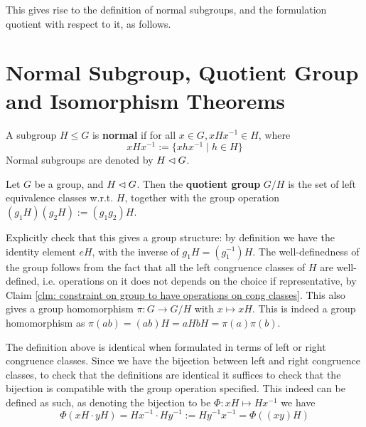\textstart
This gives rise to the definition of normal subgroups, and the formulation quotient with respect to it, as follows.

\section{Normal Subgroup, Quotient Group and Isomorphism Theorems}

\begin{definition}
    A subgroup $H \leq G$ is \textbf{normal} if for all $x \in G, xHx^{-1} \in H$, where
    \[
        xHx^{-1} := \{ xhx^{-1} \mid h \in H \}
    \]
    Normal subgroups are denoted by $H \lhd G$.
\end{definition}

\begin{definition}
    Let $G$ be a group, and $H \lhd G$. Then the \textbf{quotient group} $G/H$ is the set of left equivalence classes w.r.t. $H$, together with the group operation $(g_1 H)(g_2 H) := (g_1 g_2) H$.
\end{definition}

\begin{remark}\label{rmk: projection to quotient}
    Explicitly check that this gives a group structure: by definition we have the identity element $eH$, with the inverse of $g_1 H = (g_1^{-1})H$. The well-definedness of the group follows from the fact that all the left congruence classes of $H$ are well-defined, i.e. operations on it does not depends on the choice if representative, by Claim \ref{clm: constraint on group to have operations on cong classes}. This also gives a group homomorphism $\pi: G \to G/H$ with $x \mapsto xH$. This is indeed a group homomorphism as $\pi(ab) = (ab) H = aH bH = \pi(a) \pi(b)$. 
\end{remark}
    
\begin{remark}
    The definition above is identical when formulated in terms of left or right congruence classes. Since we have the bijection between left and right congruence classes, to check that the definitions are identical it suffices to check that the bijection is compatible with the group operation specified. This indeed can be defined as such, as denoting the bijection to be $\Phi: xH \mapsto Hx^{-1}$ we have
    \[
        \Phi(xH \cdot yH) = Hx^{-1} \cdot Hy^{-1} := H y^{-1} x^{-1} = \Phi((xy) H)
    \]
\end{remark}

